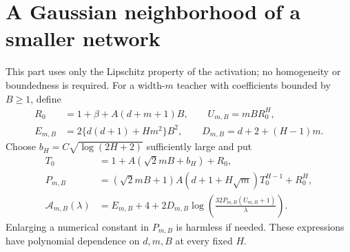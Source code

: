 \section{A Gaussian neighborhood of a smaller network}
\label{sec:teacher}
This part uses only the Lipschitz property of the activation; no homogeneity or boundedness is required.
For a width-$m$ teacher with coefficients bounded by $B\ge1$, define
\begin{align}
 R_0&=1+\beta+A(d+m+1)B,\qquad U_{m,B}=mB R_0^H,\\
 E_{m,B}&=2\{d(d+1)+Hm^2\}B^2,\qquad D_{m,B}=d+2+(H-1)m.
 \label{eq:teacher-costs}
\end{align}
Choose $b_H=C\sqrt{\log(2H+2)}$ sufficiently large and put
\begin{align}
 T_0&=1+A(\sqrt2mB+b_H)+R_0,\\
 P_{m,B}&=(\sqrt2mB+1)A(d+1+H\sqrt m)T_0^{H-1}+R_0^H,\\
 \mathcal A_{m,B}(\lambda)
 &=E_{m,B}+4+
       2D_{m,B}\log\!\left(\frac{32P_{m,B}(U_{m,B}+1)}{\lambda}\right).
 \label{eq:Ag}
\end{align}
Enlarging a numerical constant in $P_{m,B}$ is harmless if needed.
These expressions have polynomial dependence on $d,m,B$ at every fixed $H$.

